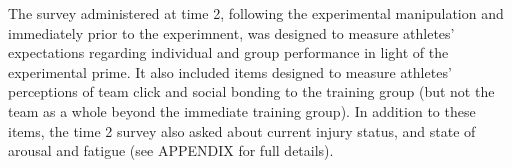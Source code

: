 \documentclass[english]{article}\usepackage[]{graphicx}\usepackage[]{color}
\begin{document}


The survey administered at time 2, following the experimental manipulation and immediately prior to the experimnent, was designed to measure athletes' expectations regarding individual and group performance in light of the experimental prime. It also included items designed to measure athletes' perceptions of team click and social bonding to the training group (but not the team as a whole beyond the immediate training group).
In addition to these items, the time 2 survey also asked about current injury status, and state of arousal and fatigue (see APPENDIX for full details).
\end{document}
